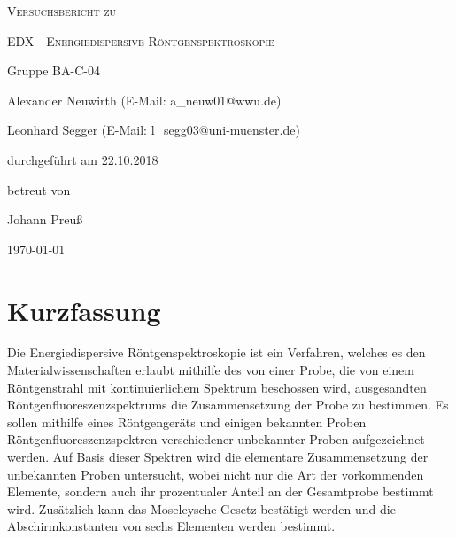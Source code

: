 \documentclass[
	a4paper,
	12pt,
	pagesize,
	ngerman
]{scrartcl}
\begin{document}
	
	\begin{titlepage}
		\centering
		{\scshape\LARGE Versuchsbericht zu \par}
		\vspace{1cm}
		{\scshape\huge EDX - Energiedispersive Röntgenspektroskopie \par}
		\vspace{2.5cm}
		{\LARGE Gruppe BA-C-04 \par}
		\vspace{0.5cm}
		
		{\large Alexander Neuwirth (E-Mail: a\_neuw01@wwu.de) \par}
		{\large Leonhard Segger (E-Mail: l\_segg03@uni-muenster.de) \par}
		\vfill
		
		durchgeführt am 22.10.2018\par
		betreut von\par
		{\large Johann Preuß} %
		
		\vfill
		
		{\large \today\par}
	\end{titlepage}
	\tableofcontents
	\newpage


	\section{Kurzfassung}
	Die Energiedispersive Röntgenspektroskopie ist ein Verfahren, welches es den Materialwissenschaften erlaubt mithilfe des von einer Probe, die von einem Röntgenstrahl mit kontinuierlichem Spektrum beschossen wird, ausgesandten Röntgenfluoreszenzspektrums die Zusammensetzung der Probe zu bestimmen.
	Es sollen mithilfe eines Röntgengeräts und einigen bekannten Proben Röntgenfluoreszenzspektren verschiedener unbekannter Proben aufgezeichnet werden.%
	Auf Basis dieser Spektren wird die elementare Zusammensetzung der unbekannten Proben untersucht, wobei nicht nur die Art der vorkommenden Elemente, sondern auch ihr prozentualer Anteil an der Gesamtprobe bestimmt wird. %
	Zusätzlich kann das Moseleysche Gesetz bestätigt werden und die Abschirmkonstanten von sechs Elementen werden bestimmt. %
	
\end{document}
